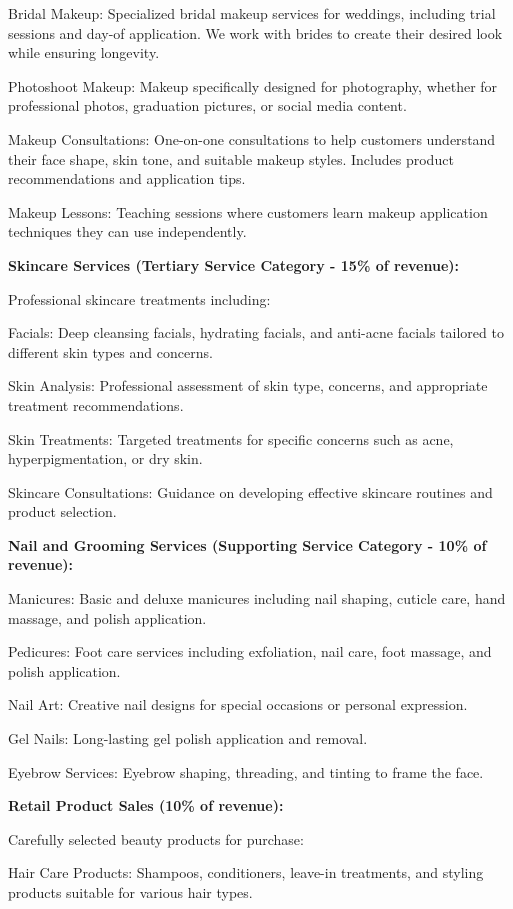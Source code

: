 \documentclass[a4paper,12pt]{article}
\begin{document}
Bridal Makeup: Specialized bridal makeup services for weddings, including trial sessions and day-of application. We work with brides to create their desired look while ensuring longevity.

Photoshoot Makeup: Makeup specifically designed for photography, whether for professional photos, graduation pictures, or social media content.

Makeup Consultations: One-on-one consultations to help customers understand their face shape, skin tone, and suitable makeup styles. Includes product recommendations and application tips.

Makeup Lessons: Teaching sessions where customers learn makeup application techniques they can use independently.

\textbf{Skincare Services (Tertiary Service Category - 15\% of revenue):}

Professional skincare treatments including:

Facials: Deep cleansing facials, hydrating facials, and anti-acne facials tailored to different skin types and concerns.

Skin Analysis: Professional assessment of skin type, concerns, and appropriate treatment recommendations.

Skin Treatments: Targeted treatments for specific concerns such as acne, hyperpigmentation, or dry skin.

Skincare Consultations: Guidance on developing effective skincare routines and product selection.

\textbf{Nail and Grooming Services (Supporting Service Category - 10\% of revenue):}

Manicures: Basic and deluxe manicures including nail shaping, cuticle care, hand massage, and polish application.

Pedicures: Foot care services including exfoliation, nail care, foot massage, and polish application.

Nail Art: Creative nail designs for special occasions or personal expression.

Gel Nails: Long-lasting gel polish application and removal.

Eyebrow Services: Eyebrow shaping, threading, and tinting to frame the face.

\textbf{Retail Product Sales (10\% of revenue):}

Carefully selected beauty products for purchase:

Hair Care Products: Shampoos, conditioners, leave-in treatments, and styling products suitable for various hair types.
\end{document}
